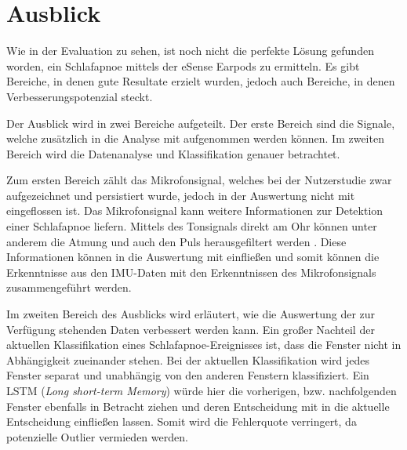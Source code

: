 
\chapter{Ausblick}
\label{ch:FutureWork}
%

Wie in der Evaluation zu sehen, ist noch nicht die perfekte Lösung gefunden worden, ein Schlafapnoe mittels der eSense Earpods zu ermitteln.
Es gibt Bereiche, in denen gute Resultate erzielt wurden, jedoch auch Bereiche, in denen Verbesserungspotenzial steckt. 

Der Ausblick wird in zwei Bereiche aufgeteilt.
Der erste Bereich sind die Signale, welche zusätzlich in die Analyse mit aufgenommen werden können.
Im zweiten Bereich wird die Datenanalyse und Klassifikation genauer betrachtet.

Zum ersten Bereich zählt das Mikrofonsignal, welches bei der Nutzerstudie zwar aufgezeichnet und persistiert wurde, jedoch in der Auswertung nicht mit eingeflossen ist. 
Das Mikrofonsignal kann weitere Informationen zur Detektion einer Schlafapnoe liefern. 
Mittels des Tonsignals direkt am Ohr können unter anderem die Atmung und auch den Puls herausgefiltert werden \cite{nomaWearableDataAcquisition2005}.
Diese Informationen können in die Auswertung mit einfließen und somit können die Erkenntnisse aus den IMU-Daten mit den Erkenntnissen des Mikrofonsignals zusammengeführt werden.

Im zweiten Bereich des Ausblicks wird erläutert, wie die Auswertung der zur Verfügung stehenden Daten verbessert werden kann.
Ein großer Nachteil der aktuellen Klassifikation eines Schlafapnoe-Ereignisses ist, dass die Fenster nicht in Abhängigkeit zueinander stehen. 
Bei der aktuellen Klassifikation wird jedes Fenster separat und unabhängig von den anderen Fenstern klassifiziert.
Ein LSTM (\textit{Long short-term Memory}) würde hier die vorherigen, bzw. nachfolgenden Fenster ebenfalls in Betracht ziehen und deren Entscheidung mit in die aktuelle Entscheidung einfließen lassen. 
Somit wird die Fehlerquote verringert, da potenzielle Outlier vermieden werden.

